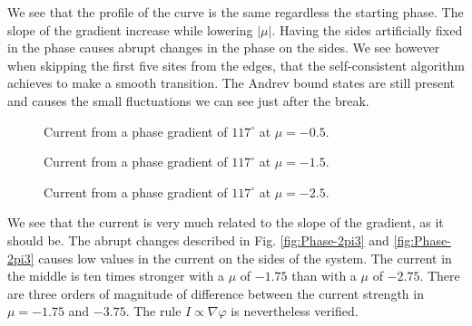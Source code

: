 \documentclass[..\main.tex]{subfile}
\begin{document}
We see that the profile of the curve is the same regardless the starting phase. The slope of the gradient increase while lowering $|\mu|$.
Having the sides artificially fixed in the phase causes abrupt changes in the phase on the sides. We see however when skipping the first
 five sites from the edges, that the self-consistent
algorithm achieves to make a smooth transition. The Andrev bound states are still present and causes the small fluctuations we can see just after the
break.\\
\begin{figure}[H]
    
    \caption{Current from a phase gradient of $117^{\circ}$ at $\mu = -0.5$.}
\end{figure}
\begin{figure}[H]
    
    \caption{Current from a phase gradient of $117^{\circ}$ at $\mu = -1.5$.}
\end{figure}
\begin{figure}[H]
    
    \caption{Current from a phase gradient of $117^{\circ}$ at $\mu = -2.5$.}
\end{figure}

We see that the current is very much related to the slope of the gradient, as it should be. 
The abrupt changes described in Fig. \ref{fig:Phase-2pi3} and \ref{fig:Phase-2pi3} causes low values in the current on the sides of the system. 
The current in the middle is ten times stronger with a $\mu$ of $-1.75$ than with a $\mu$ of $-2.75$. There are three orders of magnitude
of difference between the current strength in $\mu = -1.75$ and $-3.75$. The rule $I\propto\nabla\varphi$ is nevertheless verified.\\
\end{document}
